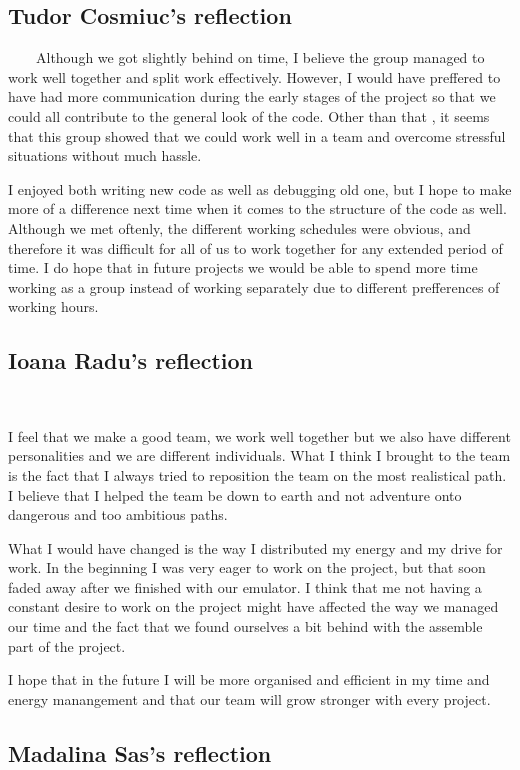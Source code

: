 \documentclass{article}
\begin{document}
\subsection{Tudor Cosmiuc's reflection}

\ \ \ \ Although we got slightly behind on time, I believe the group managed
to work well together and split work effectively. However, I would have
preffered to have had more communication during the early stages of the
project so that we could all contribute to the general look of the code. Other
than that , it seems that this group showed that we could work well in a team
and overcome stressful situations without much hassle.

I enjoyed both writing new code as well as debugging old one, but I hope to
make more of a difference next time when it comes to the structure of the code
as well. Although we met oftenly, the different working schedules were
obvious, and therefore it was difficult for all of us to work together for any
extended period of time. I do hope that in future projects we would be able to
spend more time working as a group instead of working separately due to
different prefferences of working hours.

\subsection{Ioana Radu's reflection}

\ \ \ \

I feel that we make a good team, we work well together but we also have
different personalities and we are different individuals. What I think I
brought to the team is the fact that I always tried to reposition the team on
the most realistical path. I believe that I helped the team be down to earth
and not adventure onto dangerous and too ambitious paths.

What I would have changed is the way I distributed my energy and my drive for
work. In the beginning I was very eager to work on the project, but that soon
faded away after we finished with our emulator. I think that me not having a
constant desire to work on the project might have affected the way we managed
our time and the fact that we found ourselves a bit behind with the assemble
part of the project.

I hope that in the future I will be more organised and efficient in my time
and energy manangement and that our team will grow stronger with every
project.

\subsection{Madalina Sas's reflection}
\end{document}
